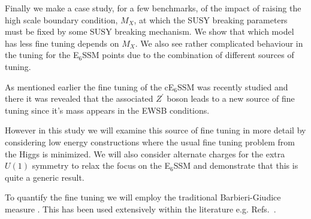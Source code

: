 \documentclass[preprint,amsmath,amssymb,aps,superscriptaddress,prd,
showpacs,floatfix,nofootinbib]{revtex4-1}
\begin{document}
Finally we make a case study, for a few benchmarks, of the impact of
raising the high scale boundary condition, $M_X$, at which the SUSY
breaking parameters must be fixed by some SUSY breaking mechanism.  We
show that which model has less fine tuning depends on $M_X$.  We also
see rather complicated behaviour in the tuning for the E$_6$SSM points
due to the combination of different sources of tuning.

As mentioned earlier the fine tuning of the cE$_6$SSM was recently studied
\cite{Athron:2013ipa} and there it was revealed that the associated
$Z^\prime$ boson leads to a new source of fine tuning since it's mass
appears in the EWSB conditions.

However in this study we will examine this source of fine tuning in more
detail by considering low energy constructions where the usual fine
tuning problem from the Higgs is minimized.  We will also consider
alternate charges for the extra $U(1)$ symmetry to relax the focus on
the E$_6$SSM and demonstrate that this is quite a generic result.

To quantify the fine tuning we will employ the traditional
Barbieri-Giudice measure \cite{Ellis:1986yg, Barbieri:1987fn}.  This
has been used extensively within the literature
e.g. Refs.~\cite{deCarlos:1993yy, deCarlos:1993ca, Chankowski:1997zh,
  Agashe:1997kn, Wright:1998mk, Kane:1998im, BasteroGil:1999gu,
  Feng:1999zg, Allanach:2000ii, Dermisek:2005ar, Barbieri:2005kf,
  Allanach:2006jc, Gripaios:2006nn, Dermisek:2006py, Barbieri:2006dq,
  Kobayashi:2006fh, Perelstein:2012qg, Antusch:2012gv,Cheng:2012pe,
  CahillRowley:2012rv, Ross:2012nr, Basak:2012bd, Kang:2012sy,
  Athron:2013ipa, Boehm:2013qva, Miller:2013jra, Binjonaid:2014oga,
  Miller:2014jza}.
\end{document}
